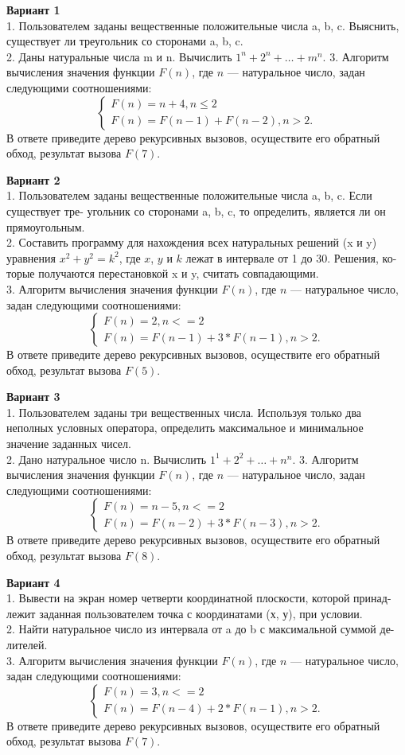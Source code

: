 \documentclass[12pt]{extarticle}
\begin{document}
\textbf{Вариант 1} \\
1. Пользователем заданы вещественные положительные числа a, b, c. Выяснить, существует ли
треугольник со сторонами a, b, c. \\
2. Даны натуральные числа m и n. Вычислить $1^n + 2^n + \ldots + m^n$.
3. Алгоритм вычисления значения функции $F(n)$, где $n$ — натуральное число, задан следующими соотношениями:
$$\begin{cases}
	F(n) = n+4, n \leq 2 \\
	F(n) = F(n-1) + F(n-2), n > 2.
\end{cases}$$
В ответе приведите дерево рекурсивных вызовов, осуществите его обратный обход, результат вызова $F(7)$.

\textbf{Вариант 2} \\
1. Пользователем заданы вещественные положительные числа a, b, c. Если существует тре-
угольник со сторонами a, b, c, то определить, является ли он прямоугольным. \\
2. Составить программу для нахождения всех натуральных решений (x и y)
уравнения $x^2 + y^2 = k^2$, где $x$, $y$ и $k$ лежат в интервале от 1 до 30. Решения, ко-
торые получаются перестановкой x и y, считать совпадающими.\\
3. Алгоритм вычисления значения функции $F(n)$, где $n$ — натуральное число, задан следующими соотношениями:
$$\begin{cases}
	F(n) = 2, n <= 2 \\
	F(n) = F(n-1) + 3*F(n-1), n > 2.
\end{cases}$$
В ответе приведите дерево рекурсивных вызовов, осуществите его обратный обход, результат вызова $F(5)$.

\textbf{Вариант 3} \\
1. Пользователем заданы три вещественных числа. Используя только два неполных условных
оператора, определить максимальное и минимальное значение заданных чисел.\\
2. Дано натуральное число n. Вычислить $1^1 + 2^2 + \ldots + n^n$.
3. Алгоритм вычисления значения функции $F(n)$, где $n$ — натуральное число, задан следующими соотношениями:
$$\begin{cases}
	F(n) = n-5, n <= 2 \\
	F(n) = F(n-2) + 3*F(n-3), n > 2.
\end{cases}$$
В ответе приведите дерево рекурсивных вызовов, осуществите его обратный обход, результат вызова $F(8)$.

\textbf{Вариант 4} \\
1. Вывести на экран номер четверти координатной плоскости, которой принад-
лежит заданная пользователем точка с координатами (х, у), при условии. \\
2. Найти натуральное число из интервала от a до b с максимальной суммой де-
лителей.\\
3. Алгоритм вычисления значения функции $F(n)$, где $n$ — натуральное число, задан следующими соотношениями:
$$\begin{cases}
	F(n) = 3, n <= 2 \\
	F(n) = F(n-4) + 2*F(n-1), n > 2.
\end{cases}$$
В ответе приведите дерево рекурсивных вызовов, осуществите его обратный обход, результат вызова $F(7)$.
\end{document}
